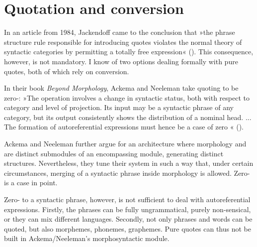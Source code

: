 \documentclass[output=paper]{LSP/langsci}
\begin{document}
\section{Quotation and conversion}

In an article from 1984, Jackendoff came to the conclusion that »the phrase structure rule responsible for introducing {\ob}quotes{\cb} violates the normal theory of syntactic categories by permitting a totally free expression« (\citealt[26]{Jackendoff1984}). This consequence, however, is not mandatory. I know of two options dealing formally with pure quotes, both of which rely on conversion.
 
In their book \textit{Beyond Morphology}, Ackema and Neeleman take quoting to be zero-: »{\ob}T{\cb}he operation involves a change in syntactic status, both with respect to category and level of projection. Its input may be a syntactic phrase of any category, but its output consistently shows the distribution of a nominal head. {\ob}...{\cb} The formation of autoreferential expressions must hence be a case of zero « (\citealt[153-154]{AN04}).
 
Ackema and Neeleman further argue for an architecture where morphology and  are distinct submodules of an encompassing module, generating distinct structures. Nevertheless, they tune their system in such a way that, under certain circumstances, merging of a syntactic phrase inside morphology is allowed. Zero- is a case in point.
 
Zero- to a syntactic phrase, however, is not sufficient to
deal with autoreferential expressions. Firstly, the phrases can be
fully ungrammatical, purely non-sensical, or they can mix different
languages. Secondly, not only phrases and words can be quoted, but
also morphemes, phonemes, graphemes. Pure quotes can thus not be built in Ackema/Neeleman's morphosyntactic module.\largerpage[1.5]
 
\end{document}
